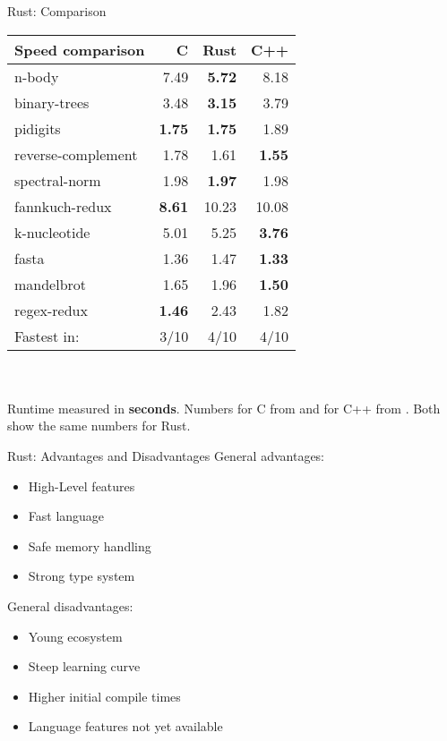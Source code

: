 \begin{frame}[c]{Rust: Comparison}
    \normalsize
    \vfill
    \begin{tabular}{lrrr}
        \textbf{Speed comparison} & C & Rust & C++ \\ \hline
        n-body & 7.49 & \textbf{5.72} & 8.18 \\
        binary-trees & 3.48 & \textbf{3.15} & 3.79 \\
        pidigits & \textbf{1.75} & \textbf{1.75} & 1.89 \\
        reverse-complement & 1.78 & 1.61 & \textbf{1.55} \\
        spectral-norm & 1.98 & \textbf{1.97} & 1.98 \\
        fannkuch-redux & \textbf{8.61} & 10.23 & 10.08 \\
        k-nucleotide & 5.01 & 5.25 & \textbf{3.76} \\
        fasta & 1.36 & 1.47 & \textbf{1.33} \\
        mandelbrot & 1.65 & 1.96 & \textbf{1.50} \\
        regex-redux & \textbf{1.46} & 2.43 & 1.82 \\ \hline
        Fastest in: & 3/10 & 4/10 & 4/10 \\
    \end{tabular} \\ \\
    \footnotesize
    Runtime measured in \textbf{seconds}. Numbers for C from \cite{benchc} and for C++ from
    \cite{benchcpp}. Both show the same numbers for Rust.

\end{frame}



\begin{frame}[c]{Rust: Advantages and Disadvantages}
    General advantages:
    \begin{itemize}[<+(1)->]
        \item High-Level features
        \item Fast language
        \item Safe memory handling
        \item Strong type system
    \end{itemize}
    \pause
    General disadvantages:
    \begin{itemize}[<+(1)->]
        \item Young ecosystem
        \item Steep learning curve
        \item Higher initial compile times
        \item Language features not yet available
    \end{itemize}
\end{frame}


